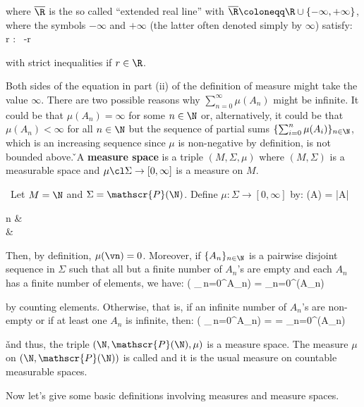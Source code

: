 where $\overline{\R}$ is the so called ``extended real line'' with $\overline{\R} \coloneqq \R \cup \{-\infty,
+\infty\}$, where the symbols $-\infty$ and $+\infty$ (the latter often denoted simply by $\infty$) satisfy:
\bse
\forall \, r \in \overline{\R} : \ -\infty\leq r \leq \infty
\ese

with strict inequalities if $r\in\R$.
\een
\ed

Both sides of the equation in part (ii) of the definition of measure might take the value $\infty$. There are two
possible reasons why $\sum_{n=0}^{\infty}\mu(A_n)$ might be infinite. It could be that $\mu(A_n) = \infty$ for some
$n\in \N$ or, alternatively, it could be that $\mu(A_n) < \infty$ for all $n \in \N$ but the sequence of partial sums
$\{ \sum_{i=0}^{n}\mu(A_i)\}_{n\in\N}$, which is an increasing sequence since $\mu$ is non-negative by definition, is
not bounded above. \v

A \textbf{measure space} is a triple $(M,\Sigma,\mu)$ where $(M,\Sigma)$ is a measurable space and
$\mu\cl\Sigma\to[0,\infty]$ is a measure on $M$.
\ed

\be \
Let $M=\N$ and $\Sigma=\mathscr{P}(\N)$. Define $\mu : \Sigma \to [0, \infty]$ by:
\bse
\mu(A) = |A| \coloneqq
\begin{cases}
n & \\ \infty & 
\end{cases}
\ese

Then, by definition, $\mu(\vn) =0$. Moreover, if $\{A_n\}_{n\in\N}$ is a pairwise disjoint sequence in $\Sigma$ such
that all but a finite number of $A_n$'s are empty and each $A_n$ has a finite number of elements, we have:
\bse
\mu \biggl( \bigcup_{\,n=0}^{\infty}A_n\biggr) = \sum_{n=0}^{\infty}\mu(A_n)
\ese

by counting elements. Otherwise, that is, if an infinite number of $A_n$'s are non-empty or if at least one $A_n$ is
infinite, then:
\bse
\mu \biggl( \bigcup_{\,n=0}^{\infty}A_n\biggr) = \infty = \sum_{n=0}^{\infty}\mu(A_n)
\ese

\v

and thus, the triple $(\N,\mathscr{P}(\N),\mu)$ is a measure space. The measure $\mu$ on $(\N,\mathscr{P}(\N))$ is
called \say{counting measure} and it is the usual measure on countable measurable spaces.
\ee

Now let's give some basic definitions involving measures and measure spaces.

